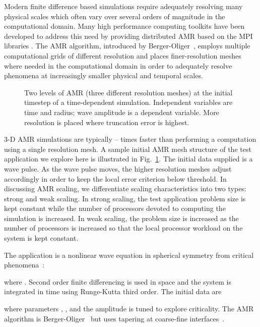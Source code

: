 \documentclass{revtex4}
\begin{document}
Modern finite difference based simulations require adequately
resolving many physical scales which often vary over several orders of
magnitude in the computational domain.  Many high performance
computing toolkits have been developed to address this need by
providing distributed AMR based on the MPI libraries \cite{Carpet, SAMRAI,had_webpage,Chombo,PAMR,Paramesh,AMROC}.  
The AMR algorithm, introduced by Berger-Oliger~\cite{Berger}, employs multiple computational grids of 
different resolution and places finer-resolution meshes where needed in the computational domain in order to 
adequately resolve phenomena at increasingly smaller physical and temporal scales.  

\begin{figure} \centering
{} \caption{\small{Two levels of AMR (three different resolution meshes) at the initial timestep of a time-dependent simulation.  Independent variables are time and radius; wave amplitude is a dependent variable.  More resolution is placed
where truncation error is highest.}
}
\label{fig:amr_example}
\end{figure}

3-D AMR simulations are typically -- times faster than performing a computation using a single 
resolution mesh.  A sample initial AMR mesh structure of the test application we explore here is 
illustrated in Fig.~\ref{fig:amr_example}.
The initial data supplied is a wave pulse.  As the wave pulse moves, the 
higher resolution meshes adjust accordingly in order to keep the local error criterion below
threshold.  In discussing AMR scaling, we differentiate scaling characteristics into two types: strong and weak scaling.  
In strong scaling, the test application problem size is kept constant while the number of processors 
devoted to computing the simulation is increased.  In weak scaling, the problem size is increased as the 
number of processors is increased so that the local processor workload on the system is kept constant.

The application is a nonlinear wave equation in spherical symmetry from critical phenomena~\cite{liebling}:

where .
Second order finite differencing is used in space and the system is integrated in time
using Runge-Kutta third order.  The initial data are  

where parameters , , and the amplitude  is tuned to explore criticality.
The AMR algorithm is Berger-Oliger~\cite{Berger} but uses tapering at coarse-fine 
interfaces~\cite{Lehner:2005vc}.
\end{document}
